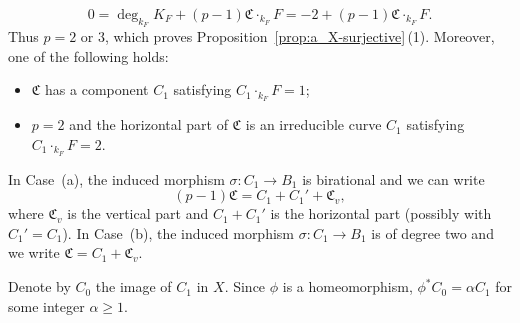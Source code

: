 \documentclass[10pt,abstract=true]{scrartcl}
\numberwithin{equation}{section}
\theoremstyle{definition}
\theoremstyle{remark}
\begin{document}
\begin{equation}\label{eq:adjunction-F}
  0=\deg_{k_F}K_F+(p-1)\mathfrak C\cdot_{k_F}F =-2+(p-1)\mathfrak C\cdot_{k_F}F.
\end{equation}
Thus $p=2$ or $3$, which proves Proposition~\ref{prop:a_X-surjective}\,(1).  Moreover, one of the following holds:
\begin{itemize}
  \item[(a)] $\mathfrak C$ has a component $C_1$  satisfying
    $C_1\cdot_{k_F}F=1$;
  \item[(b)] $p=2$ and the horizontal part of $\mathfrak C$ is an
    irreducible curve $C_1$ satisfying $C_1\cdot_{k_F}F=2$.
\end{itemize}
In Case~(a), the induced morphism $\sigma\colon C_1\to B_1$ is birational and we can write
\begin{equation}\label{eq:boundary-case-a}
  (p-1)\mathfrak C=C_1+C_1'+\mathfrak C_v,
\end{equation}
where $\mathfrak C_v$ is the vertical part and $C_1+C_1'$ is the horizontal part (possibly with
$C_1'=C_1$).  In Case~(b), the induced morphism $\sigma\colon C_1\to B_1$ is of degree two and we write
$\mathfrak C=C_1+\mathfrak C_v$.

Denote by $C_0$ the image of $C_1$ in $X$.
Since $\phi$ is a homeomorphism, $\phi^*C_0=\alpha C_1$ for some integer $\alpha\geq1$.
\end{document}
